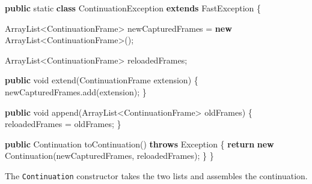 \documentclass[12pt,a4paper,oneside,openright]{book}
\newenvironment{Shaded}{\begin{snugshade}}{\end{snugshade}}
\newcommand{\KeywordTok}[1]{\textcolor[rgb]{0.13,0.29,0.53}{\textbf{{#1}}}}
\newcommand{\DataTypeTok}[1]{\textcolor[rgb]{0.13,0.29,0.53}{{#1}}}
\newcommand{\FunctionTok}[1]{\textcolor[rgb]{0.00,0.00,0.00}{{#1}}}
\newcommand{\NormalTok}[1]{{#1}}
\begin{document}
\begin{Shaded}
\begin{Highlighting}[]
\KeywordTok{public} \DataTypeTok{static} \KeywordTok{class} \NormalTok{ContinuationException }\KeywordTok{extends} \NormalTok{FastException \{}

    \NormalTok{ArrayList<ContinuationFrame>}
    \NormalTok{newCapturedFrames = }\KeywordTok{new} \NormalTok{ArrayList<ContinuationFrame>();}

    \NormalTok{ArrayList<ContinuationFrame> reloadedFrames;}

    \KeywordTok{public} \DataTypeTok{void} \FunctionTok{extend}\NormalTok{(ContinuationFrame extension) \{}
        \NormalTok{newCapturedFrames.}\FunctionTok{add}\NormalTok{(extension);}
    \NormalTok{\}}

    \KeywordTok{public} \DataTypeTok{void} \FunctionTok{append}\NormalTok{(ArrayList<ContinuationFrame> oldFrames) \{}
        \NormalTok{reloadedFrames = oldFrames;}
    \NormalTok{\}}

    \KeywordTok{public} \NormalTok{Continuation }\FunctionTok{toContinuation}\NormalTok{() }\KeywordTok{throws} \NormalTok{Exception \{}
        \KeywordTok{return} \KeywordTok{new} \FunctionTok{Continuation}\NormalTok{(newCapturedFrames,}
                                \NormalTok{reloadedFrames);}
    \NormalTok{\}}
\NormalTok{\}}
\end{Highlighting}
\end{Shaded}

The \texttt{Continuation} constructor takes the two lists and assembles
the continuation.
\end{document}
